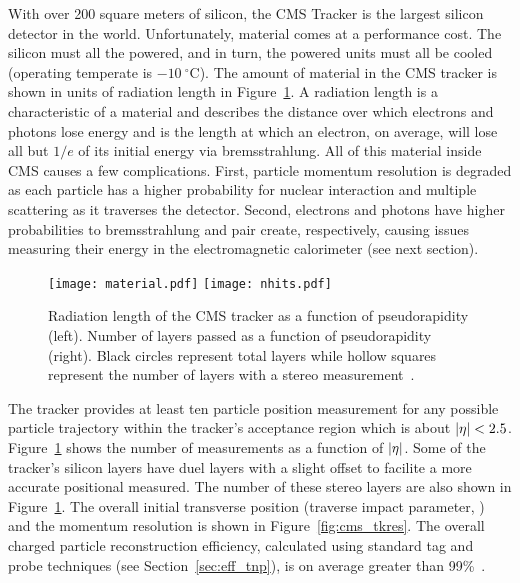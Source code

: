 With over 200 square meters of silicon, the CMS Tracker is the largest silicon
detector in the world. Unfortunately, material comes at a performance cost.
The silicon must all the powered, and in turn, the powered units must all
be cooled (operating temperate is $-10\ ^{\circ}\mathrm{C}$). The amount
of material in the CMS tracker is shown in units of radiation length in
Figure~\ref{fig:cms_material}. A radiation length is a characteristic of a
material and describes the distance over which electrons and photons lose
energy and is the length at which an electron, on average, will lose all but
$1/e$ of its initial energy via bremsstrahlung. All of this material inside CMS
causes a few complications. First, particle momentum resolution is degraded as
each particle has a higher probability for nuclear interaction and multiple
scattering as it traverses the detector. Second, electrons and photons have higher
probabilities to bremsstrahlung and pair create, respectively, causing issues
measuring their energy in the electromagnetic calorimeter (see next section).
\begin{figure}[!htb]
\begin{center}
\texttt{[image: material.pdf]}
\texttt{[image: nhits.pdf]}
\caption[
Radiation length and number of layers crossed in the CMS tracker as a function
of pseudorapidity.
]{ \label{fig:cms_material}
Radiation length of the CMS tracker as a function of pseudorapidity
(left). Number of layers passed as a function of
pseudorapidity (right). Black circles represent total layers while hollow
squares represent the number of layers with a stereo measurement~\cite{trackingperformance}.
}
\end{center}
\end{figure}

The tracker provides at least ten particle position measurement for any
possible particle trajectory within the tracker's acceptance region
which is about $\left|\eta\right| < 2.5$. Figure~\ref{fig:cms_material} shows the
number of measurements as a function of $\left|\eta\right|$. Some of the tracker's
silicon layers have duel layers with a slight offset to facilite a more
accurate positional measured. The number of these stereo layers are also
shown in Figure~\ref{fig:cms_material}. The overall initial transverse
position (traverse impact parameter, \dzero) and the momentum resolution
is shown in Figure~\ref{fig:cms_tkres}. The overall charged particle
reconstruction efficiency, calculated using standard tag and probe
techniques (see Section~\ref{sec:eff_tnp}), is on average greater than
99\%~\cite{trackingperformance}.


